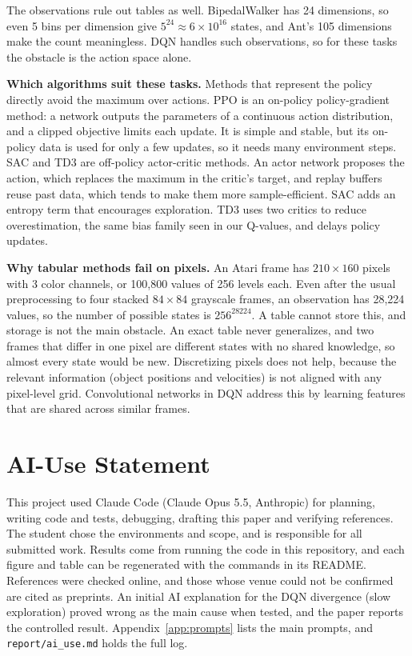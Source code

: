 \documentclass[10pt,twocolumn]{article}
\begin{document}
The observations rule out tables as well. BipedalWalker has 24 dimensions, so even 5 bins per dimension give $5^{24}\approx6\times10^{16}$ states, and Ant's 105 dimensions make the count meaningless. DQN handles such observations, so for these tasks the obstacle is the action space alone.

\textbf{Which algorithms suit these tasks.} Methods that represent the policy directly avoid the maximum over actions. PPO \cite{schulman2017} is an on-policy policy-gradient method: a network outputs the parameters of a continuous action distribution, and a clipped objective limits each update. It is simple and stable, but its on-policy data is used for only a few updates, so it needs many environment steps. SAC \cite{haarnoja2018} and TD3 \cite{fujimoto2018} are off-policy actor-critic methods. An actor network proposes the action, which replaces the maximum in the critic's target, and replay buffers reuse past data, which tends to make them more sample-efficient. SAC adds an entropy term that encourages exploration. TD3 uses two critics to reduce overestimation, the same bias family seen in our Q-values, and delays policy updates.

\textbf{Why tabular methods fail on pixels.} An Atari frame has $210\times160$ pixels with 3 color channels, or 100,800 values of 256 levels each. Even after the usual preprocessing to four stacked $84\times84$ grayscale frames, an observation has 28,224 values, so the number of possible states is $256^{28224}$. A table cannot store this, and storage is not the main obstacle. An exact table never generalizes, and two frames that differ in one pixel are different states with no shared knowledge, so almost every state would be new. Discretizing pixels does not help, because the relevant information (object positions and velocities) is not aligned with any pixel-level grid. Convolutional networks in DQN \cite{mnih2015} address this by learning features that are shared across similar frames.

\section{AI-Use Statement}
This project used Claude Code (Claude Opus 5.5, Anthropic) for planning, writing code and tests, debugging, drafting this paper and verifying references. The student chose the environments and scope, and is responsible for all submitted work. Results come from running the code in this repository, and each figure and table can be regenerated with the commands in its README. References were checked online, and those whose venue could not be confirmed are cited as preprints. An initial AI explanation for the DQN divergence (slow exploration) proved wrong as the main cause when tested, and the paper reports the controlled result. Appendix~\ref{app:prompts} lists the main prompts, and \texttt{report/ai\_use.md} holds the full log.
\end{document}
